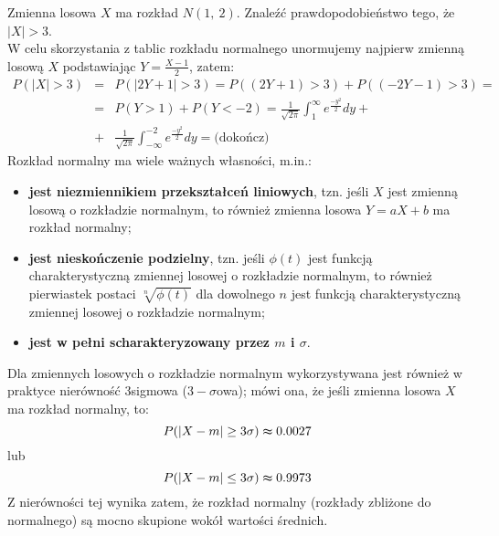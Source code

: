 \documentclass[10pt,a4paper]{article}
\begin{document}
Zmienna losowa $X$ ma rozkład $N(1,~2)$. Znaleźć prawdopodobieństwo tego, że $|X|>3$. \\
W celu skorzystania  z tablic rozkładu normalnego unormujemy najpierw zmienną losową $X$ podstawiając $Y=\frac{X-1}{2}$, zatem:
\begin{eqnarray} \nonumber
P(|X|>3) &=&P(|2Y+1|>3)=P((2Y+1)>3)+P((-2Y-1)>3)=\\\nonumber
&=&P(Y>1)+P(Y<-2)=\frac{1}{\sqrt{2\pi}}\int_1^\infty e^\frac{-y^2}{2}dy + \\\nonumber
&+&\frac{1}{\sqrt{2\pi}}\int_{-\infty}^{-2} e^\frac{-y^2}{2}dy = \textrm{(dokończ)}
\end{eqnarray}
Rozkład normalny ma wiele ważnych własności, m.in.:
\begin{itemize}
\item \textbf{jest niezmiennikiem przekształceń liniowych}, tzn. jeśli $X$ jest zmienną losową o rozkładzie normalnym, to również zmienna losowa $Y=aX+b$ ma rozkład normalny;
\item \textbf{jest nieskończenie podzielny}, tzn. jeśli $\phi(t)$ jest funkcją charakterystyczną zmiennej losowej o rozkładzie normalnym, to również
pierwiastek postaci $\sqrt[n]{\phi(t)}$ dla dowolnego $n$ jest funkcją charakterystyczną zmiennej losowej o rozkładzie normalnym;
\item \textbf{jest w pełni scharakteryzowany przez $m$ i $\sigma$}.
\end{itemize}
Dla zmiennych losowych o rozkładzie normalnym wykorzystywana jest również w praktyce nierówność 3\dywiz sigmowa ($3-\sigma$\dywiz owa); mówi ona, że jeśli zmienna losowa $X$ ma rozkład normalny, to:
\[ P(|X-m|\geq 3\sigma)\thickapprox 0.0027\]
lub
\[ P(|X-m|\leq 3\sigma)\thickapprox 0.9973 \]
Z nierówności tej wynika zatem, że rozkład normalny (rozkłady zbliżone do normalnego) są mocno skupione wokół wartości średnich.
\end{document}
